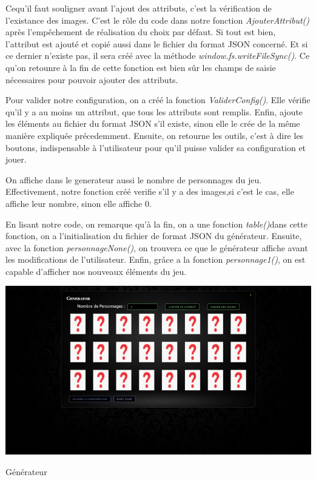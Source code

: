 \documentclass[a4paper, 12pt]{article}
\begin{document}
Cequ'il faut souligner avant l'ajout des attributs, c'est la vérification de l'existance des images. C'est le rôle du code dans notre fonction \textit{ AjouterAttribut()} après l'empêchement de réalisation du choix par défaut. Si tout est bien, l'attribut est ajouté et copié aussi dans le fichier du format JSON concerné. Et si ce dernier n'existe pas, il sera créé  avec la méthode \textit{window.fs.writeFileSync()}. \newline
Ce qu'on retounre à la fin de cette fonction est bien sûr les champs de saisie nécessaires pour pouvoir ajouter des attributs. 
\newline

Pour valider notre configuration, on a créé la fonction \textit{ValiderConfig()}. Elle vérifie qu'il y a au moins un attribut, que tous les attributs sont remplis. Enfin, ajoute les éléments au fichier du format JSON s'il existe, sinon elle le crée de la même manière expliquée précedemment. Ensuite, on retourne les outils, c'est à dire les boutons, indispensable à l'utilisateur pour qu'il puisse valider sa configuration et jouer. \newline

On affiche dans le generateur aussi le nombre de personnages du jeu. Effectivement, notre fonction créé verifie s'il y a des images,si c'est le cas, elle affiche leur nombre, sinon elle affiche 0. \newline

En lisant notre code, on remarque qu'à la fin, on a une fonction \textit{table()}dans cette fonction, on a l'initialisation du fichier de format JSON du générateur. Ensuite, avec la fonction \textit{personnageNone()}, on trouvera ce que le générateur affiche avant les modifications de l'utilisateur. Enfin, grâce a la fonction \textit{ personnage1()}, on est capable d'afficher nos nouveaux éléments du jeu. 


\begin{center}               %
  \includegraphics[scale=0.5]{Generator.png} \newline  %
\end{center}
\begin{center}   
Générateur
\end{center}
\end{document}
